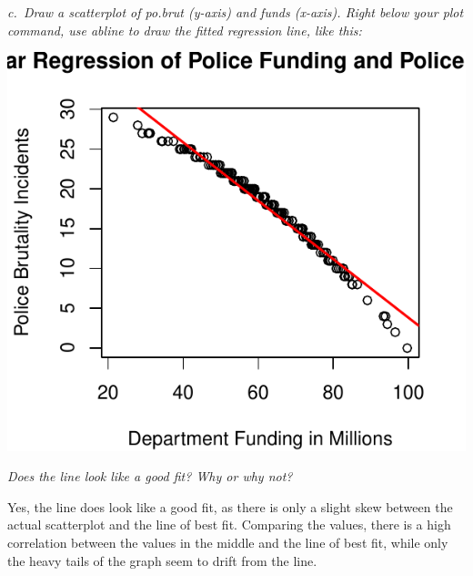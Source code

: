 \documentclass[
]{article}
\newenvironment{Shaded}{\begin{snugshade}}{\end{snugshade}}
\newcommand{\AttributeTok}[1]{\textcolor[rgb]{0.77,0.63,0.00}{#1}}
\newcommand{\DecValTok}[1]{\textcolor[rgb]{0.00,0.00,0.81}{#1}}
\newcommand{\FunctionTok}[1]{\textcolor[rgb]{0.00,0.00,0.00}{#1}}
\newcommand{\NormalTok}[1]{#1}
\newcommand{\SpecialCharTok}[1]{\textcolor[rgb]{0.00,0.00,0.00}{#1}}
\newcommand{\StringTok}[1]{\textcolor[rgb]{0.31,0.60,0.02}{#1}}
\begin{document}
\emph{c.~Draw a scatterplot of po.brut (y-axis) and funds (x-axis).
Right below your plot command, use abline to draw the fitted regression
line, like this:}

\begin{Shaded}
\end{Shaded}

\includegraphics{Journal_files/figure-latex/unnamed-chunk-43-1.pdf}

\emph{Does the line look like a good fit? Why or why not?}

Yes, the line does look like a good fit, as there is only a slight skew
between the actual scatterplot and the line of best fit. Comparing the
values, there is a high correlation between the values in the middle and
the line of best fit, while only the heavy tails of the graph seem to
drift from the line.
\end{document}
